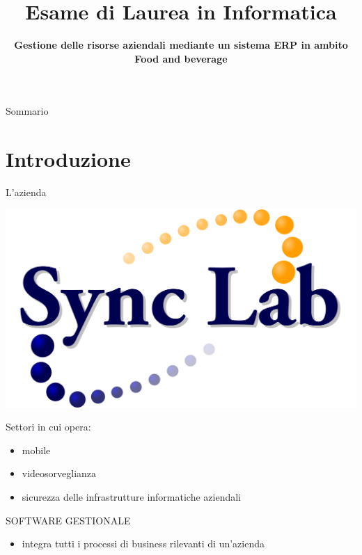 \documentclass{beamer}
\title{\small{Esame di Laurea in Informatica}}
\subtitle{\textbf{\LARGE{Gestione delle risorse aziendali mediante un sistema ERP in ambito Food and beverage}}}
\author[Giovanni Bergo]{%
	\usebox{\authbox}
}
\institute{\footnotesize{Dipartimento di Matematica ''Tullio Levi Civita''}}
\date{%
\usebox{\datebox}
}
\begin{document}
\maketitle

\begin{frame}{Sommario}
	\tableofcontents
\end{frame}

\section{Introduzione}

\begin{frame}{L'azienda}
	\begin{minipage}[c]{0.45\textwidth}
		\includegraphics[width=1\linewidth]{figures/logo_synclab}
	\end{minipage}
	\hfill
	\begin{minipage}[c]{0.45\textwidth}
		Settori in cui opera:
		\begin{itemize}
			\item mobile
			\item videosorveglianza
			\item sicurezza delle infrastrutture informatiche aziendali
		\end{itemize}
	\end{minipage}
			
	\vspace{3.0em}
	\large{\uppercase{Software Gestionale}}
	\begin{itemize}
		\item integra tutti i processi di business rilevanti di un'azienda
	
	\end{itemize}
\end{frame}
\end{document}
